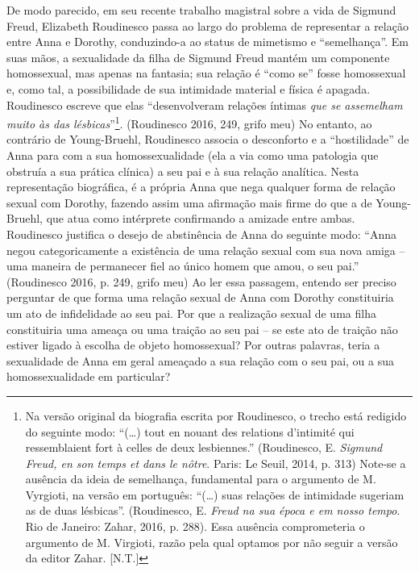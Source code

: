De modo parecido, em seu recente trabalho magistral sobre a vida de
Sigmund Freud, Elizabeth Roudinesco passa ao largo do problema de
representar a relação entre Anna e Dorothy, conduzindo-a ao status de
mimetismo e ``semelhança''. Em suas mãos, a sexualidade da filha de
Sigmund Freud mantém um componente homossexual, mas apenas na fantasia;
sua relação é ``como se'' fosse homossexual e, como tal, a possibilidade
de sua intimidade material e física é apagada. Roudinesco escreve que
elas ``desenvolveram relações íntimas \emph{que se assemelham muito às
das lésbicas}''\footnote{Na versão original da biografia escrita por
  Roudinesco, o trecho está redigido do seguinte modo: ``(\ldots{}) tout
  en nouant des relations d'intimité qui ressemblaient fort à celles de
  deux lesbiennes.'' (Roudinesco, E. \emph{Sigmund Freud, en son temps
  et dans le nôtre}. Paris: Le Seuil, 2014, p. 313) Note-se a ausência
  da ideia de semelhança, fundamental para o argumento de M. Vyrgioti,
  na versão em português: ``(\ldots{}) suas relações de intimidade
  sugeriam as de duas lésbicas''. (Roudinesco, E. \emph{Freud na sua
  época e em nosso tempo}. Rio de Janeiro: Zahar, 2016, p. 288). Essa
  ausência comprometeria o argumento de M. Virgioti, razão pela qual
  optamos por não seguir a versão da editor Zahar. {[}N.T.{]}}.
(Roudinesco 2016, 249, grifo meu) No entanto, ao contrário de
Young-Bruehl, Roudinesco associa o desconforto e a ``hostilidade'' de Anna
para com a sua homossexualidade (ela a via como uma patologia que
obstruía a sua prática clínica) a seu pai e à sua relação analítica.
Nesta representação biográfica, é a própria Anna que nega qualquer forma
de relação sexual com Dorothy, fazendo assim uma afirmação mais firme do
que a de Young-Bruehl, que atua como intérprete confirmando a amizade
entre ambas. Roudinesco justifica o desejo de abstinência de Anna do
seguinte modo: ``Anna negou categoricamente a existência de uma relação
sexual com sua nova amiga -- uma maneira de permanecer fiel ao único
homem que amou, o seu pai.'' (Roudinesco 2016, p. 249, grifo meu) Ao ler
essa passagem, entendo ser preciso perguntar de que forma uma relação
sexual de Anna com Dorothy constituiria um ato de infidelidade ao seu
pai. Por que a realização sexual de uma filha constituiria uma ameaça ou
uma traição ao seu pai -- se este ato de traição não estiver ligado à
escolha de objeto homossexual? Por outras palavras, teria a sexualidade
de Anna em geral ameaçado a sua relação com o seu pai, ou a sua
homossexualidade em particular?

